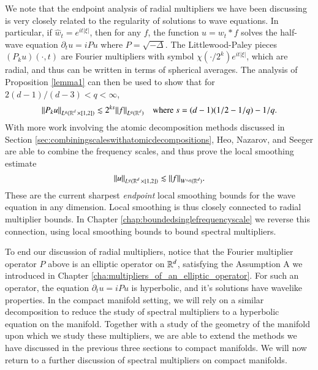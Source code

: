 We note that the endpoint analysis of radial multipliers we have been discussing is very closely related to the regularity of solutions to wave equations. In particular, if $\widehat{w}_t = e^{i t |\xi|}$, then for any $f$, the function $u = w_t * f$ solves the half-wave equation $\partial_t u = i P u$ where $P = \sqrt{-\Delta}$. The Littlewood-Paley pieces $(P_k u)(\cdot,t)$ are Fourier multipliers with symbol $\chi(\cdot / 2^k) e^{i t |\xi|}$, which are radial, and thus can be written in terms of spherical averages. The analysis of Proposition \ref{lemma1} can then be used to show that for $2(d-1)/(d-3) < q < \infty$,
%
\begin{equation}
  \| P_k u \|_{L^q( \operatorname{\mathbb{R}}^d \times [1,2] )} \lesssim 2^{k s} \| f \|_{L^q(\operatorname{\mathbb{R}}^d)}\quad\text{where}\ s = (d-1)(1/2 - 1/q) - 1/q.
\end{equation}
%
With more work involving the atomic decomposition methods discussed in Section \ref{sec:combiningscaleswithatomicdecompositions}, Heo, Nazarov, and Seeger are able to combine the frequency scales, and thus prove the local smoothing estimate
%
\begin{equation}
  \| u \|_{L^q(\operatorname{\mathbb{R}}^d \times [1,2])} \lesssim \| f \|_{W^{s,q}(\operatorname{\mathbb{R}}^d)}.
\end{equation}
%
These are the current sharpest \emph{endpoint} local smoothing bounds for the wave equation in any dimension. Local smoothing is thus closely connected to radial multiplier bounds. In Chapter \ref{chap:boundedsinglefrequencyscale} we reverse this connection, using local smoothing bounds to bound spectral multipliers.

To end our discussion of radial multipliers, notice that the Fourier multiplier operator $P$ above is an elliptic operator on $\operatorname{\mathbb{R}}^d$, satisfying the Assumption A we introduced in Chapter \ref{cha:multipliers_of_an_elliptic_operator}. For such an operator, the equation $\partial_t u = i P u$ is hyperbolic, and it's solutions have wavelike properties. In the compact manifold setting, we will rely on a similar decomposition to reduce the study of spectral multipliers to a hyperbolic equation on the manifold. Together with a study of the geometry of the manifold upon which we study these multipliers, we are able to extend the methods we have discussed in the previous three sections to compact manifolds. We will now return to a further discussion of spectral multipliers on compact manifolds.








